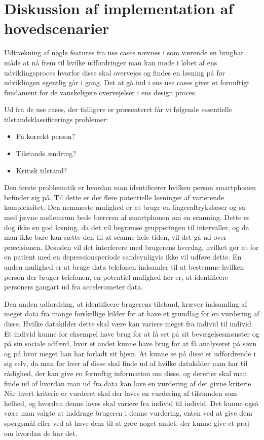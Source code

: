 \section{Diskussion af implementation af hovedscenarier}
Udtrækning af nøgle features fra use cases nævnes i \citep[Afsnit 14.4, s94]{art:essence} som værende en brugbar måde at nå frem til hvilke udfordringer man kan møde i løbet af ens udviklingsproces hvorfor disse skal overvejes og findes en løsning på før udviklingen egentlig går i gang.
Det at gå ind i ens use cases giver et fornuftigt fundament for de vanskeligere overvejelser i ens design proces.

Ud fra de use cases, der tidligere er præsenteret får vi følgende essentielle tilstandsklassificerings problemer:
\begin{itemize}
\item På korrekt person?
\item Tilstands ændring?
\item Kritisk tilstand?
\end{itemize}

Den første problematik er hvordan man identificerer hvilken person smartphonen befinder sig på.
Til dette er der flere potentielle løsninger af varierende kompleksitet.
Den nemmeste mulighed er at bruge en fingeraftrykslæser og så med jævne mellemrum bede bæreren af smartphonen om en scanning.
Dette er dog ikke en god løsning, da det vil begrænse grupperingen til intervaller, og da man ikke bare kan sætte den til at scanne hele tiden, vil det gå ud over præcisionen.
Desuden vil det interferere med brugerens hverdag, hvilket gør at for en patient med en depressionsperiode sandsynligvis ikke vil udføre dette.
En anden mulighed er at bruge data telefonen indsamler til at bestemme hvilken person der bruger telefonen, en potentiel mulighed her er, at identificere personers gangart ud fra accelerometer data.

Den anden udfordring, at identificere brugerens tilstand, kræver indsamling af meget data fra mange forskellige kilder for at have et grundlag for en vurdering af disse.
Hvilke datakilder dette skal være kan variere meget fra individ til individ.
Et individ kunne for eksempel have brug for at få set på sit bevægelsesmønster og på sin sociale adfærd, hvor et andet kunne have brug for at få analyseret på søvn og på hvor meget han har forladt sit hjem.
At kunne se på disse er udfordrende i sig selv, da man for hver af disse skal finde ud af hvilke datakilder man har til rådighed, der kan give en fornuftig information om disse, og derefter skal man finde ud af hvordan man ud fra data kan lave en vurdering af det givne kriterie.
Når hvert kriterie er vurderet skal der laves en vurdering af tilstanden som helhed, og hvordan denne laves skal variere fra individ til individ.
Det kunne også være man valgte at inddrage brugeren i denne vurdering, enten ved at give dem spørgsmål eller ved at have dem til at gøre noget andet, der kunne give et praj om hvordan de har det.

